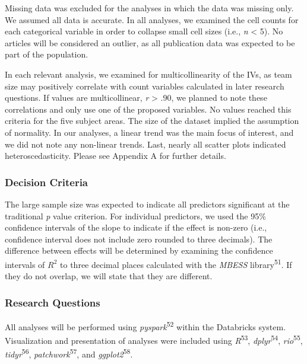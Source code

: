 \documentclass[
  man,floatsintext]{apa6}
\begin{document}
Missing data was excluded for the analyses in which the data was missing only. We assumed all data is accurate. In all analyses, we examined the cell counts for each categorical variable in order to collapse small cell sizes (i.e., \emph{n} \textless{} 5). No articles will be considered an outlier, as all publication data was expected to be part of the population.

In each relevant analysis, we examined for multicollinearity of the IVs, as team size may positively correlate with count variables calculated in later research questions. If values are multicollinear, \emph{r} \textgreater{} .90, we planned to note these correlations and only use one of the proposed variables. No values reached this criteria for the five subject areas. The size of the dataset implied the assumption of normality. In our analyses, a linear trend was the main focus of interest, and we did not note any non-linear trends. Last, nearly all scatter plots indicated heteroscedasticity. Please see Appendix A for further details.

\hypertarget{decision-criteria}{%
\subsubsection{Decision Criteria}\label{decision-criteria}}

The large sample size was expected to indicate all predictors significant at the traditional \emph{p} value criterion. For individual predictors, we used the 95\% confidence intervals of the slope to indicate if the effect is non-zero (i.e., confidence interval does not include zero rounded to three decimals). The difference between effects will be determined by examining the confidence intervals of \(R^2\) to three decimal places calculated with the \emph{MBESS} library\textsuperscript{51}. If they do not overlap, we will state that they are different.

\hypertarget{research-questions}{%
\subsubsection{Research Questions}\label{research-questions}}

All analyses will be performed using \emph{pyspark}\textsuperscript{52} within the Databricks system. Visualization and presentation of analyses were included using \emph{R}\textsuperscript{53}, \emph{dplyr}\textsuperscript{54}, \emph{rio}\textsuperscript{55}, \emph{tidyr}\textsuperscript{56}, \emph{patchwork}\textsuperscript{57}, and \emph{ggplot2}\textsuperscript{58}.
\end{document}
